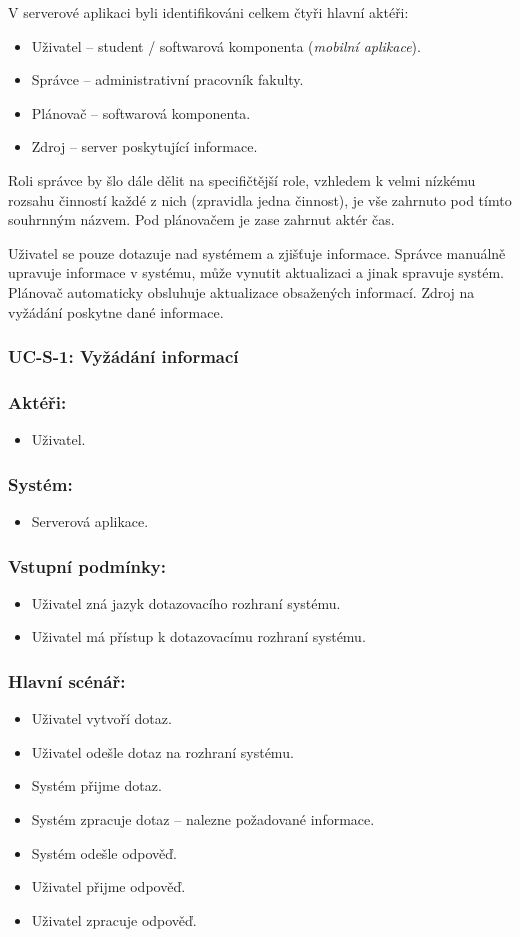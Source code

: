 V serverové aplikaci byli identifikováni celkem čtyři hlavní aktéři:
\begin{itemize}
 \item Uživatel -- student / softwarová komponenta (\textit{mobilní aplikace}).
 \item Správce -- administrativní pracovník fakulty.
 \item Plánovač -- softwarová komponenta.
 \item Zdroj -- server poskytující informace.
\end{itemize}
Roli správce by šlo dále dělit na specifičtější role, vzhledem k velmi nízkému rozsahu činností každé z nich (zpravidla jedna činnost), je vše zahrnuto pod tímto souhrnným názvem. Pod plánovačem je zase zahrnut aktér čas.

Uživatel se pouze dotazuje nad systémem a zjišťuje informace. Správce manuálně upravuje informace v systému, může vynutit aktualizaci a jinak spravuje systém. Plánovač automaticky obsluhuje aktualizace obsažených informací. Zdroj na vyžádání poskytne dané informace.

\subsubsection{UC-S-1: Vyžádání informací}
\subsubsection*{Aktéři:}
\begin{itemize}
 \item Uživatel.
\end{itemize}
\subsubsection*{Systém:}
\begin{itemize}
 \item Serverová aplikace.
\end{itemize}
\subsubsection*{Vstupní podmínky:}
\begin{itemize}
 \item Uživatel zná jazyk dotazovacího rozhraní systému.
 \item Uživatel má přístup k dotazovacímu rozhraní systému.
\end{itemize}
\subsubsection*{Hlavní scénář:}
\begin{itemize}
 \item Uživatel vytvoří dotaz.
 \item Uživatel odešle dotaz na rozhraní systému.
 \item Systém přijme dotaz.
 \item Systém zpracuje dotaz -- nalezne požadované informace.
 \item Systém odešle odpověď.
 \item Uživatel přijme odpověď.
 \item Uživatel zpracuje odpověď.
\end{itemize}
